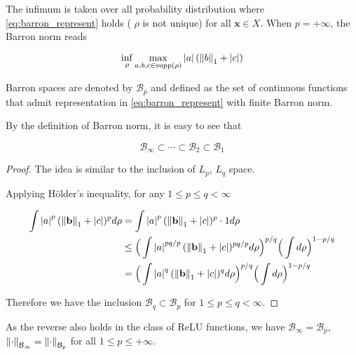 The infimum is taken over all probability distribution where
\eqref{eq:barron_represent} holds ( $\rho$ is not unique) for all
$\mathbf{x} \in X$. When $p = + \infty$, the Barron norm reads

\begin{equation}
    \inf_{\rho} \max_{a, b, c \in \operatorname{supp}(\rho)} \left| a \right| (\left\| b \right\|_1 + \left| c \right|)
\end{equation}

Barron spaces are denoted by $\mathcal{B}_p$ and defined as the set of
\textit{}{continuous} functions that admit representation in
\eqref{eq:barron_represent} with finite Barron norm.

By the definition of Barron norm, it is easy to see that

\begin{equation}
    \mathcal{B}_{\infty} \subset \cdots \subset \mathcal{B}_{2} \subset \mathcal{B}_1
\end{equation}


\begin{proof}

The idea is similar to the inclusion of $L_p$, $L_q$ space.

Applying Hölder's inequality, for any $1 \leq p \leq q < \infty$

\begin{align*}
    \int \left| a \right|^p (\left\| \mathbf{b} \right\|_1 + \left| c \right|)^p d\rho
     & = \int \left| a \right|^p (\left\| \mathbf{b} \right\|_1 + \left| c \right|)^p \cdot 1 d\rho                                                    \\
     & \leq \Big(\int \left| a \right|^{pq/p} (\left\| \mathbf{b} \right\|_1 + \left| c \right|)^{pq/p} d\rho \Big)^{p/q} \Big(\int d\rho\Big)^{1-p/q} \\
     & = \Big(\int \left| a \right|^q (\left\| \mathbf{b} \right\|_1 + \left| c \right|)^q d\rho \Big)^{p/q} \Big(\int d\rho\Big)^{1-p/q}
\end{align*}

Therefore we have the inclusion $\mathcal{B}_{q} \subset \mathcal{B}_p$ for $1
    \leq p \leq q < \infty$. 
\end{proof}

As the reverse also holds in the class of ReLU functions,  we have
$\mathcal{B}_{\infty} = \mathcal{B}_p$, $\left\| {\cdot} \right\|_{\mathcal{B}_{\infty}} =
    \left\| {\cdot} \right\|_{\mathcal{B}_{p}}$  for all $1 \leq p \leq +\infty$.

